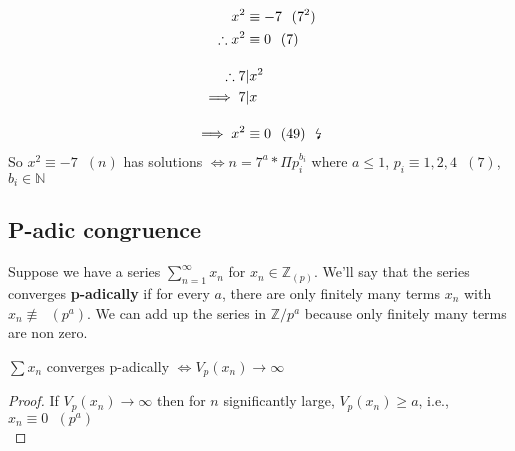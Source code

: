 \documentclass[11pt]{article}
\begin{document}
\begin{align*}
	x^2 &\equiv -7 \hspace{7pt} (7^2)\\
	\therefore x^2 &\equiv 0\hspace{7pt} (7) \\[1em]
	\therefore 7 &| x^2\\
	\implies  7 &| x\\[1em]
	\implies x^2 &\equiv 0 \hspace{7pt} (49)\hspace{7pt} \text{\lightning} 
\end{align*}
So $x^2 \equiv -7\hspace{7pt} (n) $ has solutions $\iff n = 7^a * \Pi p_i^{b_i}$ where $a\leq 1$, $p_i \equiv 1,2,4\hspace{7pt} (7)$, $b_i \in \mathbb{N}$

\subsection{P-adic congruence}
Suppose we have a series $\sum^\infty_{n=1} x_n $ for $x_n \in \mathbb{Z}_{(p)}$. We'll say that the series converges \textbf{p-adically} if for every $a$, there are only finitely many terms $x_n$ with $x_n \not \equiv \hspace{7pt} (p^a)$. We can add up the series in $\mathbb{Z}/p^a$ because only finitely many terms are non zero.


\begin{lemma}
	$\sum x_n$ converges p-adically $\iff V_p(x_n) \rightarrow \infty$ 
\end{lemma}
\begin{proof}
	If $V_p(x_n) \rightarrow \infty$ then for $n$ significantly large, $V_p(x_n) \geq a$, i.e., $x_n\equiv 0 \hspace{7pt} (p^a)$ \\[0.5em]
\end{proof}
\end{document}
